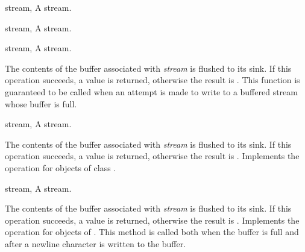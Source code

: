 \begin{optDefinition}
\begin{specargs}
    \item[stream, \classref{buffered-stream}] A stream.
\end{specargs}

\begin{specargs}
    \item[stream, \classref{file-stream}] A stream.
\end{specargs}

\begin{genericargs}
    \item[stream, \classref{buffered-stream}] A stream.
\end{genericargs}
%
\result%
The contents of the buffer associated with {\em stream} is flushed to
its sink. If this operation succeeds, a \true{} value is returned, otherwise the
result is \nil{}.
%
\remarks%
This function is guaranteed to be called when an attempt is made to
write to a buffered stream whose buffer is full.

\begin{specargs}
    \item[stream, \classref{buffered-stream}] A stream.
\end{specargs}
%
\result%
The contents of the buffer associated with {\em stream} is flushed to
its sink. If this operation succeeds, a \true{} value is returned, otherwise the
result is \nil{}.
%
\remarks%
Implements the  operation for objects of class
.

\begin{specargs}
    \item[stream, \classref{file-stream}] A stream.
\end{specargs}
%
\result%
The contents of the buffer associated with {\em stream} is flushed to
its sink. If this operation succeeds, a \true{} value is returned, otherwise the
result is \nil{}.
%
\remarks%
Implements the  operation for objects of
. This method is called both when the buffer is full and
after a newline character is written to the buffer.


\end{optDefinition}
